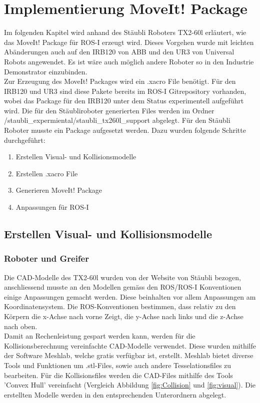 \chapter{Implementierung MoveIt! Package}\label{sec:ImplementierungMontage}
Im folgenden Kapitel wird anhand des Stäubli Roboters TX2-60l erläutert, wie das MoveIt! Package für ROS-I erzeugt wird. Dieses Vorgehen wurde mit leichten Abänderungen auch auf den IRB120 von ABB und den UR3 von Universal Robots angewendet. Es ist wäre auch möglich andere Roboter so in den Industrie Demonstrator einzubinden.\\

Zur Erzeugung des MoveIt! Packages wird ein .xacro File benötigt. Für den IRB120 und UR3 sind diese Pakete bereits im ROS-I Gitrepository vorhanden, wobei das Package für den IRB120 unter dem Status experimentell aufgeführt wird. Die für den Stäubliroboter generierten Files werden im Ordner /staubli\_expermiental/staubli\_tx260l\_support abgelegt. Für den Stäubli Roboter musste ein Package aufgesetzt werden. Dazu wurden folgende Schritte durchgeführt:
\begin{enumerate}
	\item Erstellen Visual- und Kollisionsmodelle
	\item Erstellen .xacro File
	\item Generieren MoveIt! Package
	\item Anpassungen für ROS-I
\end{enumerate}

\section{Erstellen Visual- und Kollisionsmodelle}
\subsection{Roboter und Greifer}
Die CAD-Modelle des TX2-60l wurden von der Website von Stäubli bezogen, anschliessend musste an den Modellen gemäss den ROS/ROS-I Konventionen einige Anpassungen gemacht werden. Diese beinhalten vor allem Anpassungen am Koordinatensystem. Die ROS-Konventionen bestimmen, dass relativ zu den Körpern die x-Achse nach vorne Zeigt, die y-Achse nach links und die z-Achse nach oben.\\
Damit an Rechenleistung gespart werden kann, werden für die Kollisionsberechnung vereinfachte CAD-Modelle verwendet. Diese wurden mithilfe der Software Meshlab, welche gratis verfügbar ist, erstellt. Meshlab bietet diverse Tools und Funktionen um .stl-Files, sowie auch andere Tesselationsfiles zu bearbeiten. Für die Kollisionsfiles werden die CAD-Files mithilfe des Tools 'Convex Hull' vereinfacht (Vergleich Abbildung \ref{fig:Collision} und \ref{fig:visual}). Die erstellten Modelle werden in den entsprechenden Unterordnern abgelegt.\\

